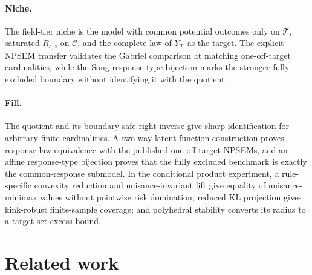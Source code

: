 \documentclass{article}
\begin{document}
\paragraph{Niche.} The field-tier niche is the model with common potential outcomes only on \(\mathcal T\), saturated \(R_{c,z}\) on \(\mathcal C\), and the complete law of \(Y_{\mathcal T}\) as the target.  The explicit NPSEM transfer validates the Gabriel comparison at matching one-off-target cardinalities, while the Song response-type bijection marks the stronger fully excluded boundary without identifying it with the quotient.

\paragraph{Fill.} The quotient and its boundary-safe right inverse give sharp identification for arbitrary finite cardinalities.  A two-way latent-function construction proves response-law equivalence with the published one-off-target NPSEMs, and an affine response-type bijection proves that the fully excluded benchmark is exactly the common-response submodel.  In the conditional product experiment, a rule-specific convexity reduction and nuisance-invariant lift give equality of nuisance-minimax values without pointwise risk domination; reduced KL projection gives kink-robust finite-sample coverage; and polyhedral stability converts its radius to a target-set excess bound.

\section{Related work}
\end{document}
